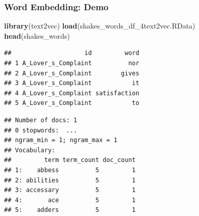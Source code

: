 \documentclass[
  shownotes,
  xcolor={svgnames},
  hyperref={colorlinks,citecolor=DarkBlue,linkcolor=DarkRed,urlcolor=DarkBlue}
  , aspectratio=169]{beamer}
\newenvironment{Shaded}{\begin{snugshade}}{\end{snugshade}}
\newcommand{\DataTypeTok}[1]{\textcolor[rgb]{0.13,0.29,0.53}{#1}}
\newcommand{\DecValTok}[1]{\textcolor[rgb]{0.00,0.00,0.81}{#1}}
\newcommand{\KeywordTok}[1]{\textcolor[rgb]{0.13,0.29,0.53}{\textbf{#1}}}
\newcommand{\NormalTok}[1]{#1}
\newcommand{\OperatorTok}[1]{\textcolor[rgb]{0.81,0.36,0.00}{\textbf{#1}}}
\newcommand{\OtherTok}[1]{\textcolor[rgb]{0.56,0.35,0.01}{#1}}
\newcommand{\StringTok}[1]{\textcolor[rgb]{0.31,0.60,0.02}{#1}}
\begin{document}
\begin{frame}[fragile]
\frametitle{Word Embedding: Demo }

\begin{scriptsize}
\begin{Shaded}
\begin{Highlighting}[]
\KeywordTok{library}\NormalTok{(text2vec)}
\KeywordTok{load}\NormalTok{(}\StringTok{\textquotesingle{}shakes\_words\_df\_4text2vec.RData\textquotesingle{}}\NormalTok{)}
\KeywordTok{head}\NormalTok{(shakes\_words)}
\end{Highlighting}
\end{Shaded}

\end{scriptsize}
\begin{tiny}


\begin{verbatim}
##                    id         word
## 1 A_Lover_s_Complaint          nor
## 2 A_Lover_s_Complaint        gives
## 3 A_Lover_s_Complaint           it
## 4 A_Lover_s_Complaint satisfaction
## 5 A_Lover_s_Complaint           to
\end{verbatim}
\end{tiny}

\begin{scriptsize}

\begin{Shaded}
\end{Shaded}

\end{scriptsize}
\begin{tiny}


\begin{verbatim}
## Number of docs: 1 
## 0 stopwords:  ... 
## ngram_min = 1; ngram_max = 1 
## Vocabulary: 
##         term term_count doc_count
## 1:    abbess          5         1
## 2: abilities          5         1
## 3: accessary          5         1
## 4:       ace          5         1
## 5:    adders          5         1
\end{verbatim}
\end{tiny}

\end{frame}
\end{document}
